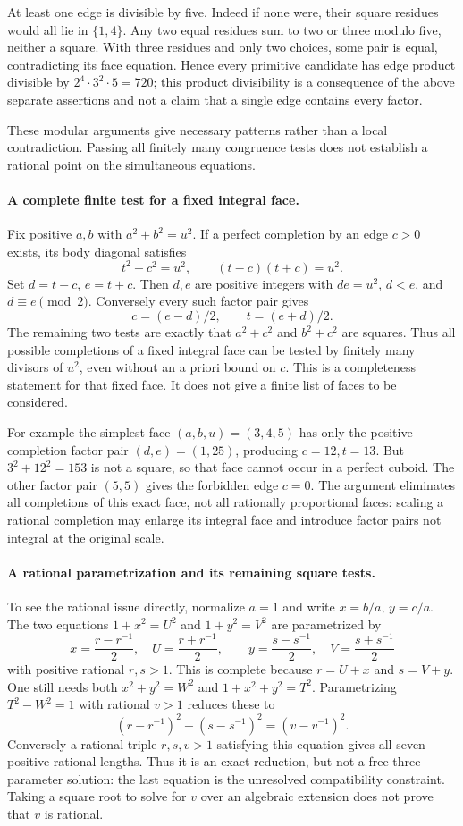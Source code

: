 \documentclass[11pt,a4paper]{article}
\begin{document}
At least one edge is divisible by five. Indeed if none were, their
square residues would all lie in $\{1,4\}$. Any two equal residues
sum to two or three modulo five, neither a square. With three residues
and only two choices, some pair is equal, contradicting its face
equation. Hence every primitive candidate has edge product divisible
by $2^4\cdot3^2\cdot5=720$; this product divisibility is a consequence
of the above separate assertions and not a claim that a single edge
contains every factor.

These modular arguments give necessary patterns rather than a local
contradiction. Passing all finitely many congruence tests does not
establish a rational point on the simultaneous equations.

\paragraph{A complete finite test for a fixed integral face.}
Fix positive $a,b$ with $a^2+b^2=u^2$. If a perfect completion by an
edge $c>0$ exists, its body diagonal satisfies
\[
 t^2-c^2=u^2,\qquad (t-c)(t+c)=u^2.
\]
Set $d=t-c$, $e=t+c$. Then $d,e$ are positive integers with
$de=u^2$, $d<e$, and $d\equiv e\pmod2$. Conversely every such factor
pair gives
\[
 c=(e-d)/2,\qquad t=(e+d)/2.
\]
The remaining two tests are exactly that $a^2+c^2$ and $b^2+c^2$
are squares. Thus all possible completions of a fixed integral face
can be tested by finitely many divisors of $u^2$, even without an a
priori bound on $c$. This is a completeness statement for that fixed
face. It does not give a finite list of faces to be considered.

For example the simplest face $(a,b,u)=(3,4,5)$ has only the positive
completion factor pair $(d,e)=(1,25)$, producing $c=12,t=13$.
But $3^2+12^2=153$ is not a square, so that face cannot occur in a
perfect cuboid. The other factor pair $(5,5)$ gives the forbidden edge
$c=0$. The argument eliminates all completions of this exact face,
not all rationally proportional faces: scaling a rational completion
may enlarge its integral face and introduce factor pairs not integral
at the original scale.

\paragraph{A rational parametrization and its remaining square tests.}
To see the rational issue directly, normalize $a=1$ and write
$x=b/a$, $y=c/a$. The two equations $1+x^2=U^2$ and
$1+y^2=V^2$ are parametrized by
\[
 x=\frac{r-r^{-1}}2,\quad U=\frac{r+r^{-1}}2,
 \qquad
 y=\frac{s-s^{-1}}2,\quad V=\frac{s+s^{-1}}2
\]
with positive rational $r,s>1$. This is complete because $r=U+x$ and
$s=V+y$. One still needs both $x^2+y^2=W^2$ and
$1+x^2+y^2=T^2$. Parametrizing $T^2-W^2=1$ with rational $v>1$
reduces these to
\[
 (r-r^{-1})^2+(s-s^{-1})^2=(v-v^{-1})^2.
\]
Conversely a rational triple $r,s,v>1$ satisfying this equation gives
all seven positive rational lengths. Thus it is an exact reduction,
but not a free three-parameter solution: the last equation is the
unresolved compatibility constraint. Taking a square root to solve for
$v$ over an algebraic extension does not prove that $v$ is rational.
\end{document}
